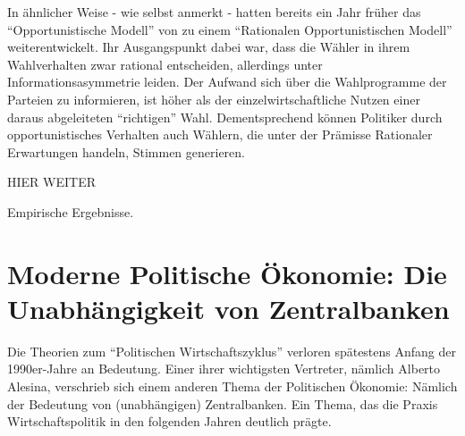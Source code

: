 In ähnlicher Weise - wie \textcite[S. 671]{Alesina1987} selbst anmerkt - hatten bereits ein Jahr früher \textcite{Rogoff1986} das "`Opportunistische Modell"' von \textcite{Nordhaus1975} zu einem "`Rationalen Opportunistischen Modell"' weiterentwickelt. Ihr Ausgangspunkt dabei war, dass die Wähler in ihrem Wahlverhalten zwar rational entscheiden, allerdings unter Informationsasymmetrie leiden. Der Aufwand sich über die Wahlprogramme der Parteien zu informieren, ist höher als der einzelwirtschaftliche Nutzen einer daraus abgeleiteten "`richtigen"' Wahl. Dementsprechend können Politiker durch opportunistisches Verhalten auch Wählern, die unter der Prämisse Rationaler Erwartungen handeln, Stimmen generieren.

HIER WEITER

\parencite[S. 542]{Snowdon2005} Empirische Ergebnisse.







\section{Moderne Politische Ökonomie: Die Unabhängigkeit von Zentralbanken}

Die Theorien zum "`Politischen Wirtschaftszyklus"' verloren spätestens Anfang der 1990er-Jahre an Bedeutung. Einer ihrer wichtigsten Vertreter, nämlich Alberto Alesina, verschrieb sich einem anderen Thema der Politischen Ökonomie: Nämlich der Bedeutung von (unabhängigen) Zentralbanken. Ein Thema, das die Praxis Wirtschaftspolitik in den folgenden Jahren deutlich prägte.

